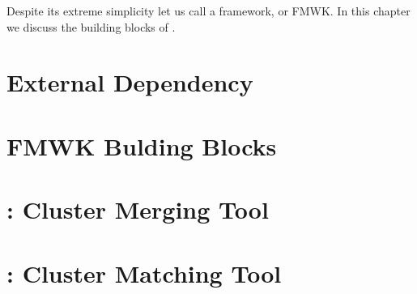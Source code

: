 
Despite its extreme simplicity let us call {\cmtool} a framework, or FMWK. 
In this chapter we discuss the building blocks of {\cmtool}.

\section{External Dependency}
\label{sec:fmwk:external}


\section{FMWK Bulding Blocks}
\label{sec:fmwk:base}


\section{{\cmerge}: Cluster Merging Tool}
\label{sec:fmwk:cmerge}


\section{{\cmatch}: Cluster Matching Tool}
\label{sec:fmwk:cmatch}


